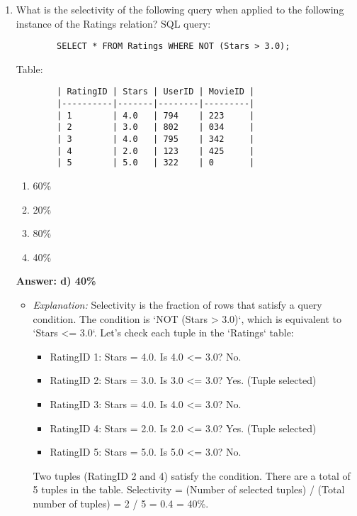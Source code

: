 \documentclass{article}
\begin{document}
\begin{enumerate}[label=\textbf{Question \arabic*.}]
    \item What is the selectivity of the following query when applied to the following instance of the Ratings relation?
        SQL query:
        \begin{verbatim}
        SELECT * FROM Ratings WHERE NOT (Stars > 3.0);
        \end{verbatim}
        Table:
        \begin{verbatim}
        | RatingID | Stars | UserID | MovieID |
        |----------|-------|--------|---------|
        | 1        | 4.0   | 794    | 223     |
        | 2        | 3.0   | 802    | 034     |
        | 3        | 4.0   | 795    | 342     |
        | 4        | 2.0   | 123    | 425     |
        | 5        | 5.0   | 322    | 0       |
        \end{verbatim}
        \begin{enumerate}[label=\alph*)]
            \item 60\%
            \item 20\%
            \item 80\%
            \item 40\%
        \end{enumerate}
        \textbf{Answer: d) 40\%}
        \begin{itemize}
            \item \textit{Explanation:} Selectivity is the fraction of rows that satisfy a query condition.
            The condition is `NOT (Stars > 3.0)`, which is equivalent to `Stars <= 3.0`.
            Let's check each tuple in the `Ratings` table:
            \begin{itemize}
                \item RatingID 1: Stars = 4.0. Is 4.0 <= 3.0? No.
                \item RatingID 2: Stars = 3.0. Is 3.0 <= 3.0? Yes. (Tuple selected)
                \item RatingID 3: Stars = 4.0. Is 4.0 <= 3.0? No.
                \item RatingID 4: Stars = 2.0. Is 2.0 <= 3.0? Yes. (Tuple selected)
                \item RatingID 5: Stars = 5.0. Is 5.0 <= 3.0? No.
            \end{itemize}
            Two tuples (RatingID 2 and 4) satisfy the condition.
            There are a total of 5 tuples in the table.
            Selectivity = (Number of selected tuples) / (Total number of tuples) = 2 / 5 = 0.4 = 40\%.
        \end{itemize}
    

\end{enumerate}
\end{document}
